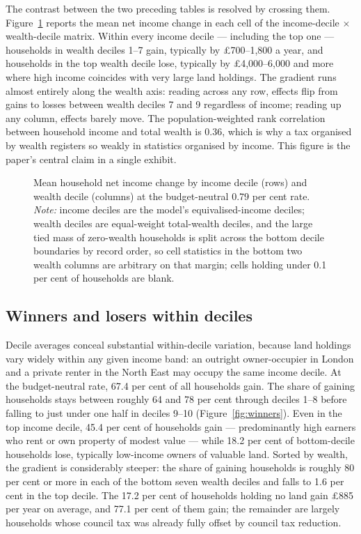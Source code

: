 The contrast between the two preceding tables is resolved by crossing them. Figure~\ref{fig:joint} reports the mean net income change in each cell of the income-decile $\times$ wealth-decile matrix. Within every income decile --- including the top one --- households in wealth deciles 1--7 gain, typically by \pounds 700--1{,}800 a year, and households in the top wealth decile lose, typically by \pounds 4{,}000--6{,}000 and more where high income coincides with very large land holdings. The gradient runs almost entirely along the wealth axis: reading across any row, effects flip from gains to losses between wealth deciles 7 and 9 regardless of income; reading up any column, effects barely move. The population-weighted rank correlation between household income and total wealth is 0.36, which is why a tax organised by wealth registers so weakly in statistics organised by income. This figure is the paper's central claim in a single exhibit.

\begin{figure}[htbp]
\centering
{}
\caption{Mean household net income change by income decile (rows) and wealth decile (columns) at the budget-neutral 0.79 per cent rate. \emph{Note:} income deciles are the model's equivalised-income deciles; wealth deciles are equal-weight total-wealth deciles, and the large tied mass of zero-wealth households is split across the bottom decile boundaries by record order, so cell statistics in the bottom two wealth columns are arbitrary on that margin; cells holding under 0.1 per cent of households are blank.}
\label{fig:joint}
\end{figure}

\subsection{Winners and losers within deciles}
\label{sec:winners}

Decile averages conceal substantial within-decile variation, because land holdings vary widely within any given income band: an outright owner-occupier in London and a private renter in the North East may occupy the same income decile. At the budget-neutral rate, 67.4 per cent of all households gain. The share of gaining households stays between roughly 64 and 78 per cent through deciles 1--8 before falling to just under one half in deciles 9--10 (Figure~\ref{fig:winners}). Even in the top income decile, 45.4 per cent of households gain --- predominantly high earners who rent or own property of modest value --- while 18.2 per cent of bottom-decile households lose, typically low-income owners of valuable land. Sorted by wealth, the gradient is considerably steeper: the share of gaining households is roughly 80 per cent or more in each of the bottom seven wealth deciles and falls to 1.6 per cent in the top decile. The 17.2 per cent of households holding no land gain \pounds 885 per year on average, and 77.1 per cent of them gain; the remainder are largely households whose council tax was already fully offset by council tax reduction.

